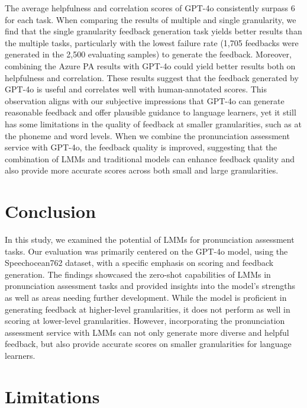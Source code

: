 \documentclass{Interspeech}
\begin{document}
The average helpfulness and correlation scores of GPT-4o consistently surpass 6 for each task. When comparing the results of multiple and single granularity, we find that the single granularity feedback generation task yields better results than the multiple tasks, particularly with the lowest failure rate (1,705 feedbacks were generated in the 2,500 evaluating samples) to generate the feedback. Moreover, combining the Azure PA results with GPT-4o could yield better results both on helpfulness and correlation. These results suggest that the feedback generated by GPT-4o is useful and correlates well with human-annotated scores. This observation aligns with our subjective impressions that GPT-4o can generate reasonable feedback and offer plausible guidance to language learners, yet it still has some limitations in the quality of feedback at smaller granularities, such as at the phoneme and word levels. When we combine the pronunciation assessment service with GPT-4o, the feedback quality is improved, suggesting that the combination of LMMs and traditional models can enhance feedback quality and also provide more accurate scores across both small and large granularities.


\section{Conclusion}

In this study, we examined the potential of LMMs for pronunciation assessment tasks. Our evaluation was primarily centered on the GPT-4o model, using the Speechocean762 dataset, with a specific emphasis on scoring and feedback generation. The findings showcased the zero-shot capabilities of LMMs in pronunciation assessment tasks and provided insights into the model's strengths as well as areas needing further development. While the model is proficient in generating feedback at higher-level granularities, it does not perform as well in scoring at lower-level granularities. However, incorporating the pronunciation assessment service with LMMs can not only generate more diverse and helpful feedback, but also provide accurate scores on smaller granularities for language learners.

\section{Limitations}
\end{document}
